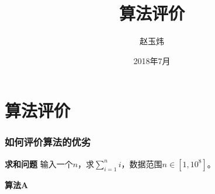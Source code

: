 \documentclass[11pt]{beamer}
\author[赵玉炜]{{\fontspec{Times New Roman}{NJUPT.SAST.ACM组}}\quad 赵玉炜}
\title{算法评价}
\date{2018年7月}
\begin{document}

	\begin{frame}
	\titlepage
	\end{frame}

	\section{算法评价}
	\begin{frame}[c]
	\frametitle{如何评价算法的优劣}
	\onslide<1->
	\begin{block}{\textbf{求和问题}}
	输入一个$n$，求$\sum_{i=1}^{n}{i}$，数据范围$n \in [1, 10^8]$。
	\end{block}
	\onslide<2->
	\textbf{算法A} \algoA


	\end{frame}
	
\end{document}
